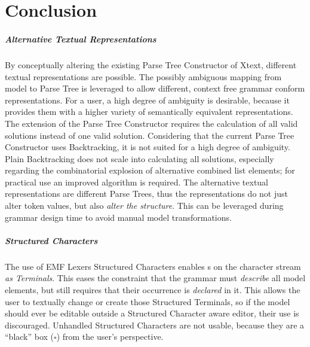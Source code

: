 \chapter{Conclusion}
\paragraph{Alternative Textual Representations}
By conceptually altering the existing Parse Tree Constructor of Xtext, different textual representations are possible. The possibly ambiguous mapping from model to Parse Tree is leveraged to allow different, context free grammar conform representations. For a user, a high degree of ambiguity is desirable, because it provides them with a higher variety of semantically equivalent representations. The extension of the Parse Tree Constructor requires the calculation of all valid solutions instead of one valid solution. Considering that the current Parse Tree Constructor uses Backtracking, it is not suited for a high degree of ambiguity. Plain Backtracking does not scale into calculating all solutions, especially regarding the combinatorial explosion of alternative combined list elements; for practical use an improved algorithm is required. The alternative textual representations are different Parse Trees, thus the representations do not just alter token values, but also \emph{alter the structure}. This can be leveraged during grammar design time to avoid manual model transformations. 

\paragraph{Structured Characters}
The use of EMF Lexers Structured Characters enables s on the character stream \emph{as Terminals}. This eases the constraint that the grammar must \emph{describe} all model elements, but still requires that their occurrence is \emph{declared} in it. This allows the user to textually change or create those Structured Terminals, so if the model should ever be editable outside a Structured Character aware editor, their use is discouraged. Unhandled Structured Characters are not usable, because they are a ``black'' box ($\square$) from the user's perspective.

